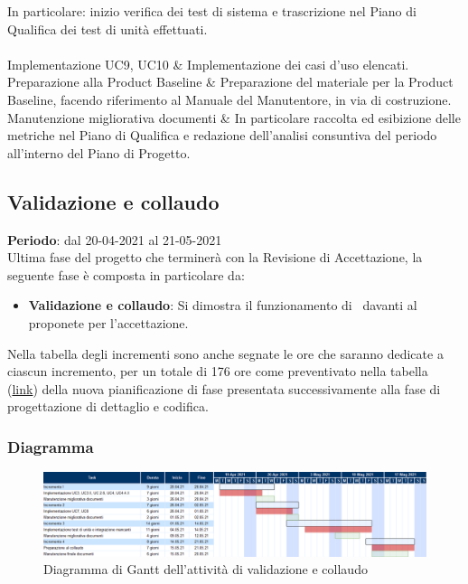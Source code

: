 \begin{longtabu}
						In particolare: inizio verifica dei test di sistema e trascrizione nel Piano di Qualifica dei test di unità effettuati. \\
					\hline
					 \\
					\hline
						Implementazione UC9, UC10 & 
						Implementazione dei casi d'uso elencati.\\
					\hline
						Preparazione alla Product Baseline & 
						Preparazione del materiale per la Product Baseline, facendo riferimento al Manuale del Manutentore, in via di costruzione.\\
					\hline
						Manutenzione migliorativa documenti & 
						In particolare raccolta ed esibizione delle metriche nel Piano di Qualifica e redazione dell'analisi consuntiva del periodo all'interno del Piano di Progetto. \\
					\hline
    		\end{longtabu}

	\subsection{Validazione e collaudo}
	\textbf{Periodo}: dal 20-04-2021 al 21-05-2021 \\
	Ultima fase del progetto che terminerà con la Revisione di Accettazione, la seguente fase è composta in particolare da:
	\begin{itemize}
		\item \textbf{Validazione e collaudo}: Si dimostra il funzionamento di \hd\ davanti al proponete per l'accettazione.
	\end{itemize}
	\noindent Nella tabella degli incrementi sono anche segnate le ore che saranno dedicate a ciascun incremento, per un totale di 176 ore come preventivato nella tabella (\hyperref[table:nuovo_orario_codifica]{link}) della nuova pianificazione di fase presentata successivamente alla fase di progettazione di dettaglio e codifica.
	
	\subsubsection{Diagramma}
		\begin{figure}[H]
        		\centering
        		\includegraphics[width=\textwidth]{source/img/Validazione_collaudo.png}
        		\caption{Diagramma di Gantt dell'attività di validazione e collaudo}
    		\end{figure}
